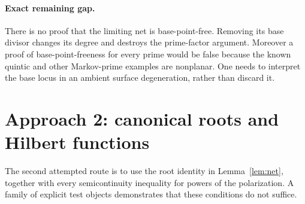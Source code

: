 \documentclass[11pt]{article}
\theoremstyle{remark}\newtheorem{remark}[theorem]{Remark}
\begin{document}
\paragraph{Exact remaining gap.}
There is no proof that the limiting net is base-point-free. Removing its base divisor changes its degree and destroys the prime-factor argument. Moreover a proof of base-point-freeness for every prime would be false because the known quintic and other Markov-prime examples are nonplanar. One needs to interpret the base locus in an ambient surface degeneration, rather than discard it.

\section{Approach 2: canonical roots and Hilbert functions}
The second attempted route is to use the root identity in Lemma~\ref{lem:net}, together with every semicontinuity inequality for powers of the polarization. A family of explicit test objects demonstrates that these conditions do not suffice.
\end{document}

